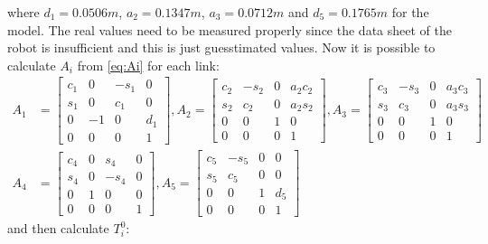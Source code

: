 where $d_1 = 0.0506m$, $a_2 = 0.1347m$, $a_3 = 0.0712m$ and $d_5 = 0.1765m$ for the model. The real values need to be measured properly since the data sheet of the robot is insufficient and this is just guesstimated values\cite{Crustcrawler}. 
Now it is possible to calculate $A_i$ from \eqref{eq:Ai} for each link: 
\begin{align*}
A_1 &= \begin{bmatrix} 
            c_1 & 0 & -s_1 & 0\\
            s_1 & 0 & c_1 & 0\\
            0 & -1 & 0 & d_1\\
            0 & 0 & 0 & 1
        \end{bmatrix},
A_2 = \begin{bmatrix} 
            c_2 & -s_2 & 0 & a_2c_2\\
            s_2 & c_2 & 0 & a_2s_2\\
            0 & 0 & 1 & 0\\
            0 & 0 & 0 & 1
        \end{bmatrix},
A_3 = \begin{bmatrix} 
            c_3 & -s_3 & 0 & a_3c_3\\
            s_3 & c_3 & 0 & a_3s_3\\
            0 & 0 & 1 & 0\\
            0 & 0 & 0 & 1
        \end{bmatrix}\\
A_4 &= \begin{bmatrix} 
            c_4 & 0 & s_4 & 0\\
            s_4 & 0 & -s_4 & 0\\
            0 & 1 & 0 & 0\\
            0 & 0 & 0 & 1
        \end{bmatrix},
A_5 = \begin{bmatrix} 
            c_5 & -s_5 & 0 & 0\\
            s_5 & c_5 & 0 & 0\\
            0 & 0 & 1 & d_5 \\
            0 & 0 & 0 & 1
        \end{bmatrix}
\end{align*}
 and then calculate $T_i^0$:
